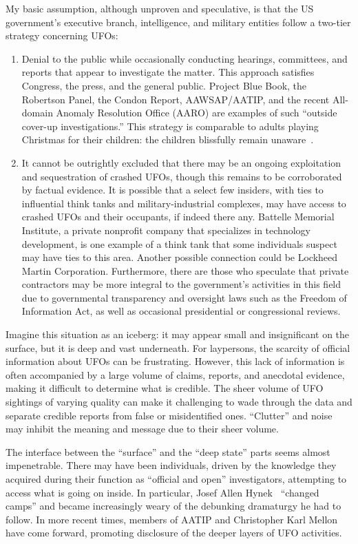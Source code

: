 My basic assumption, although unproven and speculative, is that the US government's executive branch, intelligence, and military entities follow a two-tier strategy concerning UFOs:
\begin{enumerate}
\item
Denial to the public while occasionally conducting hearings, committees, and reports that appear to investigate the matter. This approach satisfies Congress, the press, and the general public. Project Blue Book, the Robertson Panel, the Condon Report, AAWSAP/AATIP, and the recent All-domain Anomaly Resolution Office (AARO) are examples of such ``outside cover-up investigations.'' This strategy is comparable to adults playing Christmas for their children: the children blissfully remain unaware~\cite{Loewe-Christmas}.
\item
It cannot be outrightly excluded that there may be an ongoing exploitation and sequestration of crashed UFOs, though this remains to be corroborated by factual evidence. It is possible that a select few insiders, with ties to influential think tanks and military-industrial complexes, may have access to crashed UFOs and their occupants, if indeed there any.
Battelle Memorial Institute, a private nonprofit company that specializes in technology development, is one example of a think tank that some individuals suspect may have ties to this area. Another possible connection could be Lockheed Martin Corporation. Furthermore, there are those who speculate that private contractors may be more integral to the government's activities in this field due to governmental transparency and oversight laws such as the Freedom of Information Act, as well as occasional presidential or congressional reviews.
\end{enumerate}

Imagine this situation as an iceberg: it may appear small and insignificant on the surface, but it is deep and vast underneath. For laypersons, the scarcity of official information about UFOs can be frustrating. However, this lack of information is often accompanied by a large volume of claims, reports, and anecdotal evidence, making it difficult to determine what is credible. The sheer volume of UFO sightings of varying quality can make it challenging to wade through the data and separate credible reports from false or misidentified ones. ``Clutter'' and noise may inhibit the meaning and message due to their sheer volume.

The interface between the ``surface'' and the ``deep state'' parts seems almost impenetrable. There may have been individuals, driven by the knowledge they acquired during their function as ``official and open'' investigators, attempting to access what is going on inside. In particular, Josef Allen Hynek~\cite{Hynek:53,Hynek_1969,Hynek1972,Hynek1975Dec,Hynek1977Jan} ``changed camps'' and became increasingly weary of the debunking dramaturgy he had to follow. In more recent times, members of AATIP and Christopher Karl Mellon~\cite{Mellon2018Mar,Mellon2022Dec} have come forward, promoting disclosure of the deeper layers of UFO activities.





